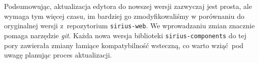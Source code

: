 Podsumowując, aktualizacja edytora do nowszej wersji zazwyczaj jest prosta, ale
wymaga tym więcej czasu, im bardziej go zmodyfikowaliśmy w porównaniu do
oryginalnej wersji z~repozytorium \texttt{sirius-web}. We wprowadzaniu zmian
znacznie pomaga narzędzie \emph{git}. Każda nowa wersja biblioteki
\texttt{sirius-components} do tej pory zawierała zmiany łamiące kompatybilność
wsteczną, co warto wziąć pod uwagę planując proces aktualizacji.

